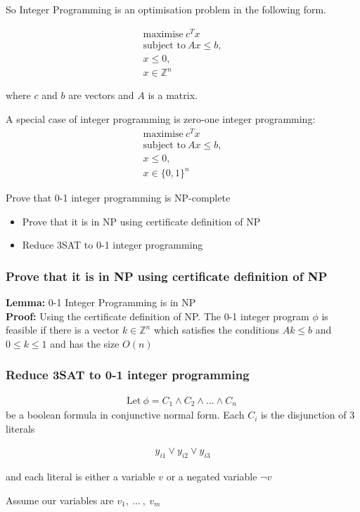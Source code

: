 \documentclass[mathserif]{beamer}
\begin{document}
\begin{frame}
So Integer Programming is an optimisation problem in the following form.

\begin{align*}
\text{maximise}\ c^Tx\\
\text{subject to}\ Ax \leq b,\\
x \leq 0,\\
x \in \mathbb{Z}^n
\end{align*}

where $c$ and $b$ are vectors and $A$ is a matrix.

\end{frame}

\begin{frame}
A special case of integer programming is zero-one integer programming:
\begin{align*}
\text{maximise}\ c^Tx\\
\text{subject to}\ Ax \leq b,\\
x \leq 0,\\
x \in \{0, 1\}^n
\end{align*}
\end{frame}

\begin{frame}
Prove that 0-1 integer programming is NP-complete
\begin{itemize}
\item Prove that it is in NP using certificate definition of NP
\item Reduce 3SAT to 0-1 integer programming
\end{itemize}
\end{frame}

\begin{frame}
\frametitle{Prove that it is in NP using certificate definition of NP}
\textbf{Lemma:} 0-1 Integer Programming is in NP\\
\textbf{Proof:} Using the certificate definition of NP. The 0-1 integer program
$\phi$ is feasible if there is a vector $k \in \mathbb{Z}^n$ which satisfies
the conditions $Ak \leq b$ and $0 \leq k \leq 1$ and has the size $O(n)$
\end{frame}

\begin{frame}
\frametitle{Reduce 3SAT to 0-1 integer programming}
\begin{align*}
\text{Let}\ \phi = C_1 \wedge C_2 \wedge \ldots \wedge C_n\
\end{align*}
be a boolean formula in conjunctive normal form. Each $C_i$ is the disjunction of 3 literals

\begin{align*}
y_{i1} \vee y_{i2} \vee y_{i3}
\end{align*}

and each literal is either a variable $v$ or a negated variable $\neg v$

Assume our variables are $v_1,\ \ldots\ ,\ v_m$

\end{frame}
\end{document}

